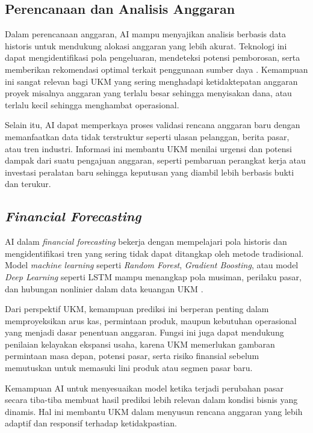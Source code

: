 \subsection{Perencanaan dan Analisis Anggaran}
Dalam perencanaan anggaran, AI mampu menyajikan analisis berbasis data historis untuk mendukung alokasi anggaran yang lebih akurat. Teknologi ini dapat mengidentifikasi pola pengeluaran, mendeteksi potensi pemborosan, serta memberikan rekomendasi optimal terkait penggunaan sumber daya \autocite{marotta2022}. Kemampuan ini sangat relevan bagi UKM yang sering menghadapi ketidaktepatan anggaran proyek misalnya anggaran yang terlalu besar sehingga menyisakan dana, atau terlalu kecil sehingga menghambat operasional.

Selain itu, AI dapat memperkaya proses validasi rencana anggaran baru dengan memanfaatkan data tidak terstruktur seperti ulasan pelanggan, berita pasar, atau tren industri. Informasi ini membantu UKM menilai urgensi dan potensi dampak dari suatu pengajuan anggaran, seperti pembaruan perangkat kerja atau investasi peralatan baru sehingga keputusan yang diambil lebih berbasis bukti dan terukur.

\subsection{\textit{Financial Forecasting}}
AI dalam \textit{financial forecasting} bekerja dengan mempelajari pola historis dan mengidentifikasi tren yang sering tidak dapat ditangkap oleh metode tradisional. Model \textit{machine learning} seperti \textit{Random Forest}, \textit{Gradient Boosting}, atau model \textit{Deep Learning} seperti LSTM mampu menangkap pola musiman, perilaku pasar, dan hubungan nonlinier dalam data keuangan UKM \autocite{fischer2018}. 

Dari perspektif UKM, kemampuan prediksi ini berperan penting dalam memproyeksikan arus kas, permintaan produk, maupun kebutuhan operasional yang menjadi dasar penentuan anggaran. Fungsi ini juga dapat mendukung penilaian kelayakan ekspansi usaha, karena UKM memerlukan gambaran permintaan masa depan, potensi pasar, serta risiko finansial sebelum memutuskan untuk memasuki lini produk atau segmen pasar baru.

Kemampuan AI untuk menyesuaikan model ketika terjadi perubahan pasar secara tiba-tiba membuat hasil prediksi lebih relevan dalam kondisi bisnis yang dinamis. Hal ini membantu UKM dalam menyusun rencana anggaran yang lebih adaptif dan responsif terhadap ketidakpastian.

